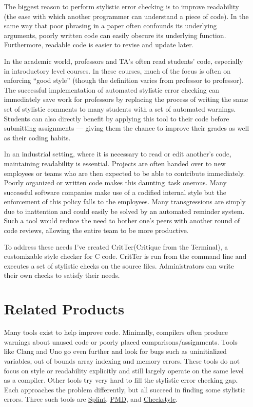 \documentclass[12pt]{report}
\newcommand{\programName}{CritTer\xspace}
\begin{document}
The biggest reason to perform stylistic error checking is to improve readability (the 
ease with which another programmer can understand a piece of code). In the same way that 
poor phrasing in a paper often confounds its underlying arguments, poorly written code can easily 
obscure its underlying function. Furthermore, readable code is easier to revise and update later. 

In the academic world, professors and TA's often read students' code, especially in introductory level
courses. In these courses, much of the focus is often on enforcing ``good style'' (though the definition 
varies from professor to professor).  The successful implementation of automated stylistic error 
checking can immediately save work for professors by replacing the process of writing the same set of 
stylistic comments to many students with a set of automated warnings. Students can also directly 
benefit by applying this tool to their code before submitting assignments --- giving them the chance to 
improve their grades as well as their coding habits.

In an industrial setting, where it is necessary to read or edit another's code, maintaining readability is 
essential. Projects are often handed over to new employees or teams who are then expected to be 
able to contribute immediately. Poorly organized or written code makes this daunting\ task 
onerous. Many successful software companies make use of a codified internal style but the 
enforcement of this policy falls to the employees. Many transgressions are simply due to inattention 
and could easily be solved by an automated reminder system. Such a tool would reduce the need to 
bother one's peers with another round of code reviews, allowing the entire team to be more productive. 

To address these needs I've created \programName (Critique from the Terminal), a customizable style 
checker for C code. \programName is run from the command line and executes a set of stylistic checks 
on the source files. Administrators can write their own checks to satisfy their needs. 

\chapter{Related Products}

Many tools exist to help improve code. Minimally, compilers often produce warnings about unused code 
or poorly placed comparisons\slash assignments. Tools like Clang\cite{clang} and Uno\cite{Uno} go 
even further and look for bugs such as uninitialized variables, out of bounds array indexing and memory 
errors. These tools do not focus on style or readability explicitly and still largely operate on the same 
level as a compiler.  Other tools try very hard to fill the stylistic error checking gap. Each approaches the 
problem differently, but all succeed in finding some stylistic errors. Three such tools are 
\hyperref[sec:splint]{Splint}\cite{splint-manual}, \hyperref[sec:pmdAndCheckstyle]{PMD}\cite{pmd}, and 
\hyperref[sec:pmdAndCheckstyle]{Checkstyle}\cite{checkstyle}.
\end{document}
